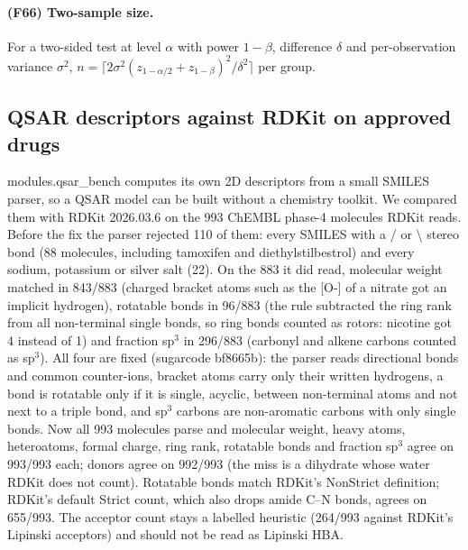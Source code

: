 \paragraph{(F66) Two-sample size.} For a two-sided test at level $\alpha$ with power $1-\beta$, difference $\delta$ and per-observation variance $\sigma^2$, $n=\big\lceil 2\sigma^2(z_{1-\alpha/2}+z_{1-\beta})^2/\delta^2\big\rceil$ per group.
\subsection{QSAR descriptors against RDKit on approved drugs}
modules.qsar\_bench computes its own 2D descriptors from a small SMILES parser, so a QSAR model can be built without a chemistry toolkit. We compared them with RDKit 2026.03.6 on the 993 ChEMBL phase-4 molecules RDKit reads. Before the fix the parser rejected 110 of them: every SMILES with a / or \textbackslash{} stereo bond (88 molecules, including tamoxifen and diethylstilbestrol) and every sodium, potassium or silver salt (22). On the 883 it did read, molecular weight matched in 843/883 (charged bracket atoms such as the [O-] of a nitrate got an implicit hydrogen), rotatable bonds in 96/883 (the rule subtracted the ring rank from all non-terminal single bonds, so ring bonds counted as rotors: nicotine got 4 instead of 1) and fraction sp$^3$ in 296/883 (carbonyl and alkene carbons counted as sp$^3$). All four are fixed (sugarcode bf8665b): the parser reads directional bonds and common counter-ions, bracket atoms carry only their written hydrogens, a bond is rotatable only if it is single, acyclic, between non-terminal atoms and not next to a triple bond, and sp$^3$ carbons are non-aromatic carbons with only single bonds. Now all 993 molecules parse and molecular weight, heavy atoms, heteroatoms, formal charge, ring rank, rotatable bonds and fraction sp$^3$ agree on 993/993 each; donors agree on 992/993 (the miss is a dihydrate whose water RDKit does not count). Rotatable bonds match RDKit's NonStrict definition; RDKit's default Strict count, which also drops amide C--N bonds, agrees on 655/993. The acceptor count stays a labelled heuristic (264/993 against RDKit's Lipinski acceptors) and should not be read as Lipinski HBA.
